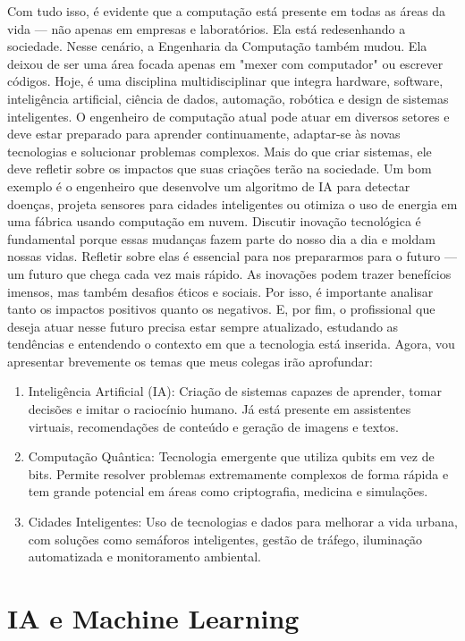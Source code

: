 \documentclass[12pt,a4paper]{article}
\begin{document}
    Com tudo isso, é evidente que a computação está presente em todas as áreas da vida — não apenas em empresas e laboratórios. Ela está redesenhando a sociedade.
    Nesse cenário, a Engenharia da Computação também mudou. Ela deixou de ser uma área focada apenas em "mexer com computador" ou escrever códigos. Hoje, é uma disciplina multidisciplinar que integra hardware, software, inteligência artificial, ciência de dados, automação, robótica e design de sistemas inteligentes.
    O engenheiro de computação atual pode atuar em diversos setores e deve estar preparado para aprender continuamente, adaptar-se às novas tecnologias e solucionar problemas complexos. Mais do que criar sistemas, ele deve refletir sobre os impactos que suas criações terão na sociedade.
    Um bom exemplo é o engenheiro que desenvolve um algoritmo de IA para detectar doenças, projeta sensores para cidades inteligentes ou otimiza o uso de energia em uma fábrica usando computação em nuvem.
    Discutir inovação tecnológica é fundamental porque essas mudanças fazem parte do nosso dia a dia e moldam nossas vidas. Refletir sobre elas é essencial para nos prepararmos para o futuro — um futuro que chega cada vez mais rápido. As inovações podem trazer benefícios imensos, mas também desafios éticos e sociais. Por isso, é importante analisar tanto os impactos positivos quanto os negativos.
    E, por fim, o profissional que deseja atuar nesse futuro precisa estar sempre atualizado, estudando as tendências e entendendo o contexto em que a tecnologia está inserida.
    Agora, vou apresentar brevemente os temas que meus colegas irão aprofundar:
    \begin{enumerate}[label=\Roman*]
      \item Inteligência Artificial (IA): Criação de sistemas capazes de aprender, tomar decisões e imitar o raciocínio humano. Já está presente em assistentes virtuais, recomendações de conteúdo e geração de imagens e textos.
      \item Computação Quântica: Tecnologia emergente que utiliza qubits em vez de bits. Permite resolver problemas extremamente complexos de forma rápida e tem grande potencial em áreas como criptografia, medicina e simulações.
      \item Cidades Inteligentes: Uso de tecnologias e dados para melhorar a vida urbana, com soluções como semáforos inteligentes, gestão de tráfego, iluminação automatizada e monitoramento ambiental.
    \end{enumerate}

    \section{IA e Machine Learning}
\end{document}
